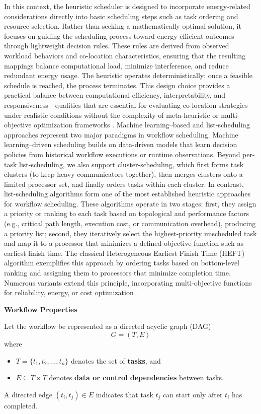 In this context, the heuristic scheduler is designed to incorporate energy-related considerations directly into basic scheduling steps such as task ordering and resource selection. Rather than seeking a mathematically optimal solution, it focuses on guiding the scheduling process toward energy-efficient outcomes through lightweight decision rules. These rules are derived from observed workload behaviors and co-location characteristics, ensuring that the resulting mappings balance computational load, minimize interference, and reduce redundant energy usage. The heuristic operates deterministically: once a feasible schedule is reached, the process terminates. This design choice provides a practical balance between computational efficiency, interpretability, and responsiveness—qualities that are essential for evaluating co-location strategies under realistic conditions without the complexity of meta-heuristic or multi-objective optimization frameworks \cite{HosseiniShirvani2024}.
Machine learning–based and list-scheduling approaches represent two major paradigms in workflow scheduling. Machine learning–driven scheduling builds on data-driven models that learn decision policies from historical workflow executions or runtime observations.
Beyond per-task list-scheduling, we also support cluster-scheduling, which first forms task clusters (to keep heavy communicators together), then merges clusters onto a limited processor set, and finally orders tasks within each cluster.
In contrast, list-scheduling algorithms form one of the most established heuristic approaches for workflow scheduling. These algorithms operate in two stages: first, they assign a priority or ranking to each task based on topological and performance factors (e.g., critical path length, execution cost, or communication overhead), producing a priority list; second, they iteratively select the highest-priority unscheduled task and map it to a processor that minimizes a defined objective function such as earliest finish time. The classical Heterogeneous Earliest Finish Time (HEFT) algorithm exemplifies this approach by ordering tasks based on bottom-level ranking and assigning them to processors that minimize completion time. Numerous variants extend this principle, incorporating multi-objective functions for reliability, energy, or cost optimization \cite{8301529}.


\textbf{Workflow Properties}

Let the workflow be represented as a directed acyclic graph (DAG)
\[
    G = (T, E)
\]
where
\begin{itemize}
    \item $T = \{t_1, t_2, \dots, t_n\}$ denotes the set of \textbf{tasks}, and
    \item $E \subseteq T \times T$ denotes \textbf{data or control dependencies} between tasks.
\end{itemize}
A directed edge $(t_i, t_j) \in E$ indicates that task $t_j$ can start only after $t_i$ has completed.

